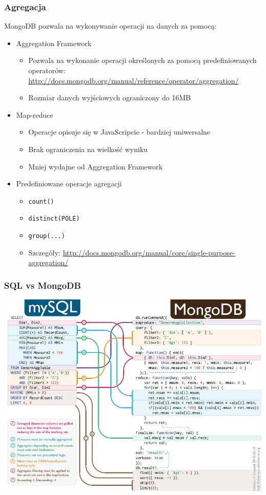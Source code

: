 \documentclass{beamer}
\begin{document}
  \begin{frame}
    \frametitle{Agregacja}
    MongoDB pozwala na wykonywanie operacji na danych za pomocą:
    \begin{itemize}
      \item Aggregation Framework
      \begin{itemize}
        \item Pozwala na wykonanie operacji określonych za pomocą predefiniowanych operatorów: \url{http://docs.mongodb.org/manual/reference/operator/aggregation/}
        \item Rozmiar danych wyjściowych ograniczony do 16MB
      \end{itemize}
      \item Map-reduce
      \begin{itemize}
        \item Operacje opisuje się w JavaScripcie - bardziej uniwersalne
        \item Brak ograniczenia na wielkość wyniku
        \item Mniej wydajne od Aggregation Framework
      \end{itemize}
      \item Predefiniowane operacje agregacji
      \begin{itemize}
        \item \texttt{count()}
        \item \texttt{distinct(POLE)}
        \item \texttt{group(...)}
        \item Szczegóły: \url{http://docs.mongodb.org/manual/core/single-purpose-aggregation/}
      \end{itemize}
    \end{itemize}
  \end{frame}

  \begin{frame}
    \frametitle{SQL vs MongoDB}
    \includegraphics[width=\textwidth,keepaspectratio]{img/mysql_vs_mongodb.jpg}
  \end{frame}
\end{document}
